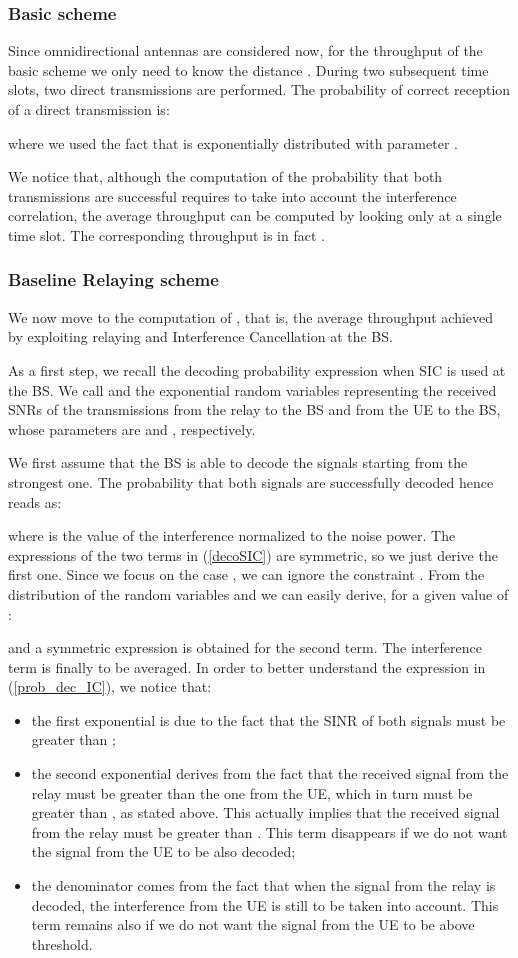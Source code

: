 \documentclass[12pt, letterpaper, onecolumn, draftcls]{IEEEtran}
\begin{document}
\subsubsection{Basic scheme}
Since omnidirectional antennas are considered now, for the throughput of the basic scheme we only need to know the distance . 
During two subsequent time slots, two direct transmissions are performed.
The probability of correct reception of a direct transmission is:

where we used the fact that  is exponentially distributed with parameter .

We notice that, although the computation of the probability that both transmissions are successful requires to take into account the interference correlation, the average throughput can be computed by looking only at a single time slot. The corresponding throughput is in fact .

\subsubsection{Baseline Relaying scheme}
We now move to the computation of , that is, the average throughput achieved by exploiting relaying and Interference Cancellation at the BS.

As a first step, we recall the decoding probability expression when SIC is used at the BS. We call  and  the exponential random variables representing the received SNRs of the transmissions from the relay to the BS and from the UE to the BS, whose parameters are  and , respectively.

We first assume that the BS is able to decode the signals starting from the strongest one. The probability that both signals are successfully decoded hence reads as:

where  is the value of the interference normalized to the noise power. The expressions of the two terms in (\ref{decoSIC}) are symmetric, so we just derive the first one. Since we focus on the case , we can ignore the constraint . From the distribution of the random variables  and  we can easily derive, for a given value of :

and a symmetric expression is obtained for the second term. The interference term  is finally to be averaged. In order to better understand the expression in (\ref{prob_dec_IC}), we notice that:
\begin{itemize}
 \item the first exponential is due to the fact that the SINR of both signals must be greater than ;
 \item the second exponential derives from the fact that the received signal from the relay must be greater than the one from the UE, which in turn must be greater than , as stated above. This actually implies that the received signal from the relay must be greater than . This term disappears if we do not want the signal from the UE to be also decoded;
 \item the denominator comes from the fact that when the signal from the relay is decoded, the interference from the UE is still to be taken into account. This term remains also if we do not want the signal from the UE to be above threshold.
\end{itemize}
\end{document}
